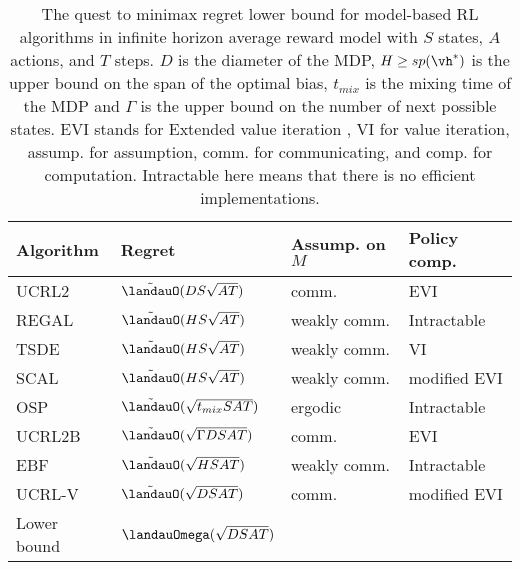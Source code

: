 \begin{table}[ht]
\begin{tabular}{|l|l|l|l|}
\hline
Algorithm & Regret & Assump. on $M$ & Policy comp.            \\ \hline
UCRL2 \cite{jaksch2010near}       & $\tilde{\landauO}(DS\sqrt{AT})$ & comm.         & EVI \\ 
REGAL \cite{bartlett2012regal}      & $\tilde{\landauO}(HS\sqrt{AT})$  & weakly comm. & Intractable   \\ 
TSDE \cite{ouyang2017learning}        & $\tilde{\landauO}(HS\sqrt{AT})$ & weakly comm. & VI       \\ 
SCAL \cite{fruit2018efficient}        & $\tilde{\landauO}(HS\sqrt{AT})$ & weakly comm. & modified EVI           \\
OSP \cite{ortner2020regret}         & $\tilde{\landauO}(\sqrt{t_{mix}SAT})$ & ergodic           & Intractable   \\ 
UCRL2B \cite{fruit2020improved}      & $\tilde{\landauO}(\sqrt{\Gamma DSAT})$ & comm.      & EVI                           \\
EBF \cite{zhang2019regret}         & $\tilde{\landauO}(\sqrt{HSAT})$ & weakly comm.     & Intractable   \\
UCRL-V \cite{tossou2019near}         & $\tilde{\landauO}(\sqrt{DSAT})$ & comm.     & modified EVI   \\ \hline
Lower bound & $\landauOmega(\sqrt{DSAT})$ \cite{jaksch2010near} &                              &                               \\ \hline
\end{tabular}
\caption{The quest to minimax regret lower bound for model-based RL algorithms in infinite horizon average reward model with $S$ states, $A$ actions, and $T$ steps.
$D$ is the diameter of the MDP, $H\ge sp(\vh^*)$ is the upper bound on the span of the optimal bias, $t_{mix}$ is the mixing time of the MDP and $\Gamma$ is the upper bound on the number of next possible states.
EVI stands for Extended value iteration \cite{jaksch2010near}, VI for value iteration, assump. for assumption, comm. for communicating, and comp. for computation.
Intractable here means that there is no efficient implementations.
}
\label{ch:rl:tab:infinite}
\end{table}


